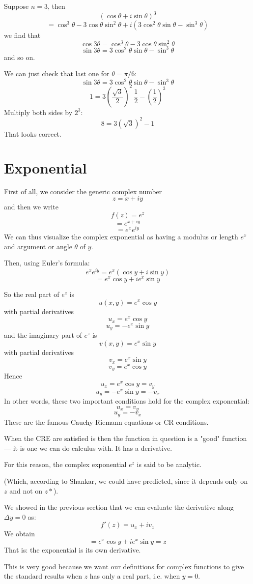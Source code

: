 \documentclass[11pt, oneside]{article}   	%
\begin{document}
Suppose $n=3$, then
\[ (\cos \theta + i \sin \theta)^3 \]
\[ = \cos^3 \theta - 3 \cos \theta \sin^2 \theta + i (3 \cos^2 \theta \sin \theta - \sin^3 \theta) \]
we find that
\[ \cos 3 \theta =\cos^3 \theta - 3 \cos \theta \sin^2 \theta \]
\[ \sin 3 \theta = 3 \cos^2 \theta \sin \theta - \sin^3 \theta \]
and so on.

We can just check that last one for $\theta = \pi/6$:
\[ \sin 3 \theta = 3 \cos^2 \theta \sin \theta - \sin^3 \theta \]
\[ 1 = 3 (\frac{\sqrt{3}}{2})^2 \ \frac{1}{2} - (\frac{1}{2})^3 \]
Multiply both sides by $2^3$:
\[ 8 = 3 (\sqrt{3})^2 - 1 \]
That looks correct.

\section{Exponential}
First of all, we consider the generic complex number
\[ z = x + iy \]
and then we write
\[ f(z) = e^z \]
\[ = e^{x + iy} \]
\[ = e^x e^{iy} \]
We can thus visualize the complex exponential as having a modulus or length $e^x$ and argument or angle $\theta$ of $y$.

Then, using Euler's formula:
\[ e^x e^{iy} = e^x (\cos y + i \sin y) \]
\[ = e^x \cos y + i e^x \sin y \]

So the real part of $e^z$ is 
\[ u(x,y) = e^x \cos y \]
with partial derivatives
\[ u_x = e^x \cos y \]
\[ u_y = - e^x \sin y \]
and the imaginary part of $e^z$ is 
\[ v(x,y) = e^x \sin y \]
with partial derivatives
\[ v_x = e^x \sin y \]
\[ v_y = e^x \cos y \]
Hence
\[ u_x = e^x \cos y = v_y \]
\[ u_y = - e^x \sin y = - v_x \]
In other words, these two important conditions hold for the complex exponential:
\[ u_x = v_y \]
\[ u_y = - v_x \]
These are the famous Cauchy-Riemann equations or CR conditions.  

When the CRE are satisfied is then the function in question is a "good" function --- it is one we can do calculus with.  It has a derivative.

For this reason, the complex exponential $e^z$ is said to be analytic. 

(Which, according to Shankar, we could have predicted, since it depends only on $z$ and not on $z*$).

We showed in the previous section that we can evaluate the derivative along $\Delta y =0$ as:
\[ f'(z) = u_x + iv_x  \]
We obtain
\[ = e^x \cos y + i e^x \sin y = z \]
That is:  the exponential is its own derivative.

This is very good because we want our definitions for complex functions to give the standard results when $z$ has only a real part, i.e. when $y=0$.
\end{document}
